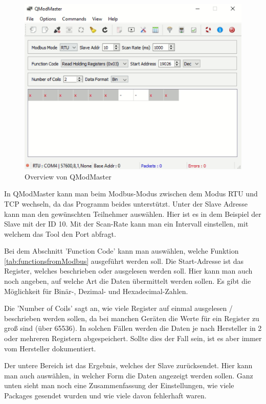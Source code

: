 \begin{figure}[h t] 
    \centering
    \includegraphics[scale=0.7]{pics/QmodMasterverview.png}
    \caption{Overview von QModMaster }
    \label{fig:impl:QmodMasterverview}
\end{figure}


In QModMaster kann man beim Modbus-Modus zwischen dem Modus RTU und TCP wechseln, da das Programm beides unterstützt. Unter der Slave Adresse kann man den gewünschten Teilnehmer auswählen. Hier ist es in dem Beispiel der Slave mit der ID 10. Mit der Scan-Rate kann man ein Intervall einstellen, mit welchem das Tool den Port abfragt.   

Bei dem Abschnitt 'Function Code' kann man auswählen, welche Funktion \ref{tab:functionsfromModbus} ausgeführt werden soll. Die Start-Adresse ist das Register, welches beschrieben oder ausgelesen werden soll. Hier kann man auch noch angeben, auf welche Art die Daten übermittelt werden sollen. Es gibt die Möglichkeit für Binär-, Dezimal- und Hexadecimal-Zahlen. 

Die 'Number of Coils' sagt an, wie viele Register auf einmal ausgelesen / beschrieben werden sollen, da bei manchen Geräten die Werte für ein Register zu groß sind (über 65536). In solchen Fällen werden die Daten je nach Hersteller in 2 oder mehreren Registern abgespeichert. Sollte dies der Fall sein, ist es aber immer vom Hersteller dokumentiert.   

Der untere Bereich ist das Ergebnis, welches der Slave zurücksendet. Hier kann man auch auswählen, in welcher Form die Daten angezeigt werden sollen. Ganz unten sieht man noch eine Zusammenfassung der Einstellungen, wie viele Packages gesendet wurden und wie viele davon fehlerhaft waren.   

